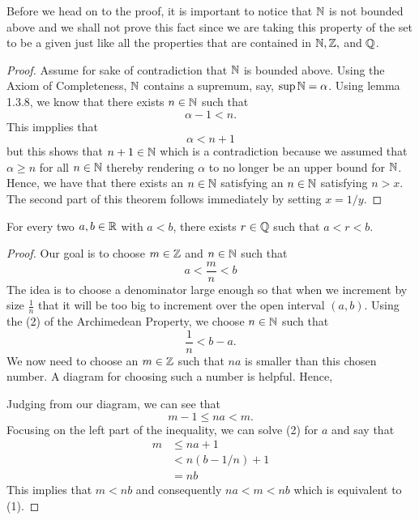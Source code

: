 Before we head on to the proof, it is important to notice that \( \mathbb{N} \) is not bounded above and we shall not prove this fact since we are taking this property of the set to be a given just like all the properties that are contained in \( \mathbb{N}, \mathbb{Z},\)  and \( \mathbb{Q} \). 

\begin{proof}
    Assume for sake of contradiction that \( \mathbb{N} \) is bounded above. Using the Axiom of Completeness, \( \mathbb{N} \) contains a supremum, say, \( \sup \mathbb{N} = \alpha \). Using lemma 1.3.8, we know that there exists \( n \in \mathbb{N} \) such that 
    \[  \alpha - 1 < n \tag{\( \epsilon = 1 \)}.\]
    This impplies that 
    \[ \alpha < n + 1 \]
    but this shows that \( n+1 \in \mathbb{N} \) which is a contradiction because we assumed that \( \alpha \geq n \) for all \( n \in \mathbb{N} \) thereby rendering \( \alpha \) to no longer be an upper bound for \( \mathbb{N} \). Hence, we have that 
    there exists an \( n \in \mathbb{N} \) satisfying an \( n \in \mathbb{N} \) satisfying \( n > x \).
    The second part of this theorem follows immediately by setting \( x = 1/y \).
\end{proof}

\begin{theorem}
        For every two \( a,b \in \mathbb{R} \) with \( a < b \), there exists \( r \in \mathbb{Q} \) such that \( a < r < b \).
    \end{theorem}


\begin{proof}
    Our goal is to choose \( m \in \mathbb{Z} \) and \( n \in \mathbb{N} \) such that 
    \[  a < \frac{ m}{n} < b \tag{1}\]
    The idea is to choose a denominator large enough so that when we increment by size \( \frac{1}{n}\) that it will be too big to increment over the open interval \( (a,b)\). Using the (2) of the Archimedean Property, we choose \( n \in \mathbb{N} \) such that 
    \[ \frac{1}{n} < b - a \tag{2}.\]
    We now need to choose an \( m \in \mathbb{Z} \) such that \( na \) is smaller than this chosen number. A diagram for choosing such a number is helpful. Hence, 

    Judging from our diagram, we can see that 
    \[ m-1 \leq na < m.\]
    Focusing on the left part of the inequality, we can solve (2) for \( a \) and say that 
    \begin{align*}
        m &\leq na + 1  \\ 
            &< n(b - 1/n) + 1 \\ 
            &= nb
    \end{align*} 
    This implies that \( m < nb \) and consequently \( na < m < nb \) which is equivalent to (1). 
    
    
\end{proof}



